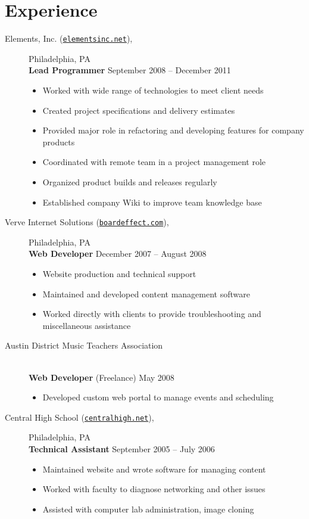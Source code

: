 \documentclass[11pt]{article}
\begin{document}
\section*{Experience}
\begin{description}
    \item [Elements, Inc. (\href{http://elementsinc.net}{\texttt{elementsinc.net}}),] Philadelphia, PA \\
        \textbf{Lead Programmer} \hfill September 2008 -- December 2011
        \begin{itemize}
            \item Worked with wide range of technologies to meet client needs
            \item Created project specifications and delivery estimates
            \item Provided major role in refactoring and developing features for company products
            \item Coordinated with remote team in a project management role
            \item Organized product builds and releases regularly
            \item Established company Wiki to improve team knowledge base
        \end{itemize}
    \item[Verve Internet Solutions (\href{http://boardeffect.com}{\texttt{boardeffect.com}}),] Philadelphia, PA \hfill \\
        \textbf{Web Developer} \hfill December 2007 -- August 2008
        \begin{itemize}
            \item Website production and technical support
            \item Maintained and developed content management software
            \item Worked directly with clients to provide troubleshooting and miscellaneous assistance
        \end{itemize}
    \item[Austin District Music Teachers Association] \hfill \\
        \textbf{Web Developer} (Freelance) \hfill May 2008
        \begin{itemize}
            \item Developed custom web portal to manage events and scheduling
        \end{itemize}
    \item[Central High School (\href{http://centralhigh.net}{\texttt{centralhigh.net}}),] Philadelphia, PA \hfill \\
        \textbf{Technical Assistant} \hfill September 2005 -- July 2006
        \begin{itemize}
            \item Maintained website and wrote software for managing content
            \item Worked with faculty to diagnose networking and other issues
            \item Assisted with computer lab administration, image cloning
        \end{itemize}
\end{description}
\end{document}
